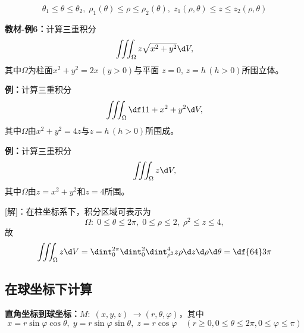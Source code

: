 $$\theta_1\leq\theta\leq\theta_2,\;
\rho_1(\theta)\leq\rho\leq\rho_2(\theta),\;
z_1(\rho,\theta)\leq z\leq z_2(\rho,\theta)$$

{\bf 教材-例6：}计算三重积分
$$\iiint_{\Omega}z\sqrt{x^2+y^2}\d V,$$
其中$\Omega$为柱面$x^2+y^2=2x\,(y>0)$与平面
$z=0,\,z=h\,(h>0)$所围立体。

{\bf 例：}计算三重积分
$$\iiint_{\Omega}\df 1{1+x^2+y^2}\d V,$$
其中$\Omega$由$x^2+y^2=4z$与$z=h\,(h>0)$所围成。

{\bf 例：}计算三重积分
$$\iiint_{\Omega}z\d V,$$
其中$\Omega$由$z=x^2+y^2$和$z=4$所围。

[解]：在柱坐标系下，积分区域可表示为
$$\Omega:\;0\leq\theta\leq2\pi,\;0\leq\rho\leq2,\;\rho^2\leq z\leq4,$$
故
$$\iiint_{\Omega}z\d V=
\dint_0^{2\pi}\dint_0^2\dint_{\rho^2}^4z\rho\d z\d\rho\d\theta
=\df{64}3\pi$$

\subsection{在球坐标下计算}

{\bf 直角坐标到球坐标：}$M:\;(x,y,z)\;\to(r,\theta,\varphi)$，其中
$$x=r\sin\varphi\cos\theta,\;y=r\sin\varphi\sin\theta,\;z=r\cos\varphi
\quad(r\geq 0,0\leq\theta\leq 2\pi,0\leq\varphi\leq\pi)$$

